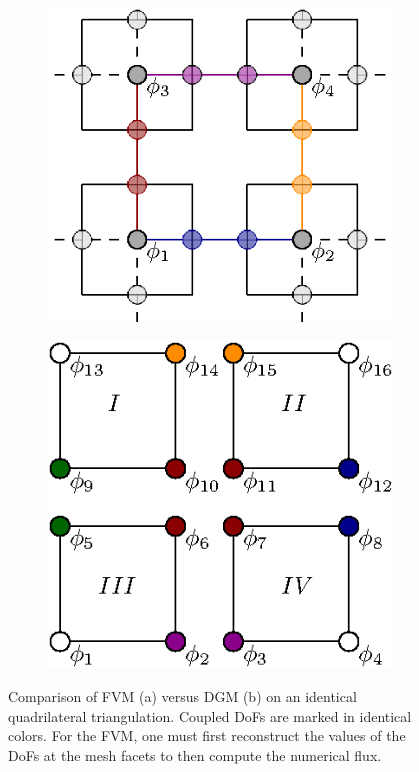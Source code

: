 \documentclass[asi,article,submit,moreauthors]{Definitions/mdpi}
\begin{document}
\begin{figure}[htbp!]
    \centering
    \captionsetup[subfigure]{justification=centering}
    \begin{subfigure}[c]{0.49\textwidth}
        \centering
        \includegraphics[]{Figs/Theory/fv-2d.eps}
        \caption{}
        \label{fig:fv-2d}
    \end{subfigure}
    \hfill
    \begin{subfigure}[c]{0.49\textwidth}
        \centering
        \includegraphics[]{Figs/Theory/dg-2d.eps}
        \caption{}
        \label{fig:dg-2d_2}
    \end{subfigure}
   \caption{Comparison of FVM (a) versus DGM (b) on an identical quadrilateral triangulation.
   Coupled DoFs are marked in identical colors.
   For the FVM, one must first reconstruct the values of the DoFs at the mesh facets to then compute the numerical flux.}
   \label{fig:fv-vs-dg-2d}
\end{figure}
\end{document}
